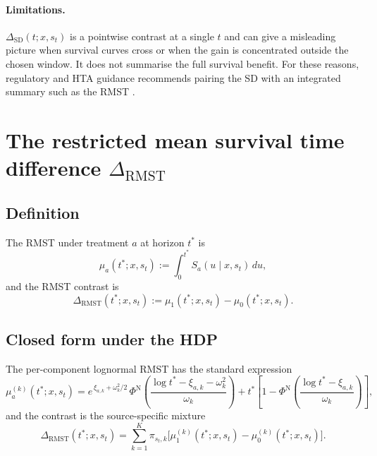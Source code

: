 \documentclass[11pt]{article}
\newcommand{\Spot}{S}
\newcommand{\RMST}{\mathrm{RMST}}
\newcommand{\SD}{\mathrm{SD}}
\begin{document}
\paragraph{Limitations.} $\Delta_{\SD}(t; x, s_{t})$ is a pointwise contrast
at a single $t$ and can give a misleading picture when survival curves
cross or when the gain is concentrated outside the chosen window. It does
not summarise the full survival benefit. For these reasons, regulatory and
HTA guidance recommends pairing the SD with an integrated summary such as
the RMST \citep{Royston2013}.

\section{The restricted mean survival time difference $\Delta_{\RMST}$}

\subsection{Definition}

The RMST under treatment $a$ at horizon $t^{*}$ is
\begin{equation}
  \mu_{a}(t^{*}; x, s_{t}) := \int_{0}^{t^{*}}\!
  \Spot_{a}(u \mid x, s_{t})\,du,
\end{equation}
and the RMST contrast is
\begin{equation}
  \Delta_{\RMST}(t^{*}; x, s_{t}) := \mu_{1}(t^{*}; x, s_{t}) - \mu_{0}(t^{*}; x, s_{t}).
\end{equation}

\subsection{Closed form under the HDP}

The per-component lognormal RMST has the standard expression
\begin{equation}
  \mu_{a}^{(k)}(t^{*}; x, s_{t})
  = e^{\,\xi_{a, k} + \omega_{k}^{2}/2}\,
    \Phi^{\mathrm{N}}\!\left(\frac{\log t^{*} - \xi_{a, k} - \omega_{k}^{2}}{\omega_{k}}\right)
  + t^{*}\!\left[1 - \Phi^{\mathrm{N}}\!\left(\frac{\log t^{*} - \xi_{a, k}}{\omega_{k}}\right)\right],
\end{equation}
and the contrast is the source-specific mixture
\begin{equation}
  \boxed{\;
    \Delta_{\RMST}(t^{*}; x, s_{t})
    = \sum_{k=1}^{K} \pi_{s_{t}, k}\bigl[
        \mu_{1}^{(k)}(t^{*}; x, s_{t}) - \mu_{0}^{(k)}(t^{*}; x, s_{t})
      \bigr].
  \;}
  \label{eq:RMST-closed}
\end{equation}
\end{document}
